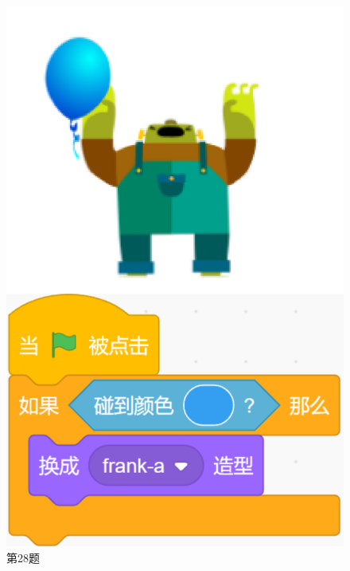 \documentclass[10pt, a4paper]{article}
\begin{document}
\begin{figure}[htbp]
\begin{minipage}[t]{.16\textwidth}
            \includegraphics[width=\textwidth]{28.png}
            \caption*{第28题}
        \end{minipage}
    \end{figure}
\end{document}
